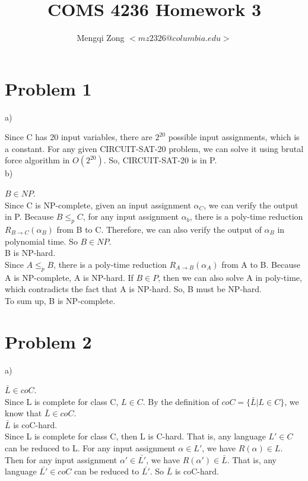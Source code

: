 \documentclass[12pt]{article}
\title{COMS 4236 Homework 3}
\author{Mengqi Zong $<mz2326@columbia.edu>$}
\begin{document}
\maketitle

\setlength{\parindent}{0in}

\section*{Problem 1}

a)

Since C has 20 input variables, there are $2^{20}$ possible input
assignments, which is a constant. For any given CIRCUIT-SAT-20
problem, we can solve it using brutal force algorithm in
$O(2^{20})$. So, CIRCUIT-SAT-20 is in P. \\

b)

$B \in NP$. \\

Since C is NP-complete, given an input assignment $\alpha_C$, we can
verify the output in P. Because $B \le_p C$, for any input assignment
$\alpha_b$, there is a poly-time reduction $R_{B \to C}(\alpha_B)$
from B to C. Therefore, we can also verify the output of $\alpha_B$ in
polynomial time. So $B \in NP$. \\

B is NP-hard. \\

Since $A \le_p B$, there is a poly-time reduction $R_{A \to
  B}(\alpha_A)$ from A to B. Because A is NP-complete, A is
NP-hard. If $B \in P$, then we can also solve A in poly-time, which 
contradicts the fact that A is NP-hard. So, B must be NP-hard. \\

To sum up, B is NP-complete.

\section*{Problem 2}

a)

$\bar {L} \in coC$. \\

Since L is complete for class C, $L \in C$. By the definition of $coC
= \{ \bar {L} | L \in C \}$, we know that $\bar {L} \in coC$. \\

$\bar {L}$ is coC-hard. \\

Since L is complete for class C, then L is C-hard. That is, any
language $L' \in C$ can be reduced to L. For any input assignment
$\alpha \in L'$, we have $R(\alpha) \in L$. Then for any input
assignment $\alpha' \in \bar {L'}$, we have $R(\alpha') \in \bar
{L}$. That is, any language $\bar {L'} \in coC$ can be reduced to $\bar
{L'}$. So $\bar {L}$ is coC-hard. \\ 
\end{document}
